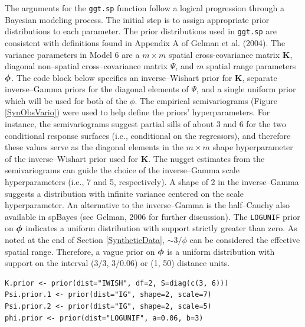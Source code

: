 \documentclass[a4paper]{article}
\newcommand{\bphi}{ \mbox{\boldmath $\phi$}}
\newcommand{\bK}{\textbf{K}}
\let\code=\texttt
\newcommand{\pkg}[1]{{\normalfont\fontseries{b}\selectfont #1}}
\begin{document}
The arguments for the \code{ggt.sp} function follow a logical
progression through a Bayesian modeling process.  The initial step
is to assign appropriate prior distributions to each parameter.  The
prior distributions used in \code{ggt.sp} are consistent with
definitions found in Appendix A of Gelman et al. (2004).   The variance
parameters in Model 6 are a $m\times m$ spatial cross-covariance
matrix $\bK$, diagonal non--spatial cross--covariance matrix $\Psi$,
and $m$ spatial range parameters $\bphi$.  The code block below
specifies an inverse--Wishart prior for $\bK$, separate
inverse--Gamma priors for the diagonal elements of $\Psi$, and a
single uniform prior which will be used for both of the $\phi$.  The
empirical semivariograms (Figure \ref{SynObsVario}) were used to
help define the priors' hyperparameters.  For instance, the
semivariograms suggest partial sills of about 3 and 6 for the two
conditional response surfaces (i.e., conditional on the regressors),
and therefore these values serve as the diagonal elements in the
$m\times m$ shape hyperparameter of the  inverse--Wishart prior used
for $\bK$.  The nugget estimates from the semivariograms can guide
the choice of the inverse--Gamma scale hyperparameters (i.e., 7 and
5, respectively).  A shape of 2 in the inverse--Gamma suggests a
distribution with infinite variance centered on the scale
hyperparameter.  An alternative to the inverse--Gamma is the
half--Cauchy also available in \pkg{spBayes} (see Gelman, 2006 for further discussion).  The
\code{LOGUNIF} prior on $\bphi$ indicates a uniform distribution
with support strictly greater than zero.  As noted at the end of
Section \ref{SyntheticData}, $\sim 3/\phi$ can be considered the
effective spatial range.  Therefore, a vague prior on $\bphi$ is a
uniform distribution with support on the interval ($3/3$, $3/0.06$) or (1, 50)
distance units.
 \begin{verbatim}
K.prior <- prior(dist="IWISH", df=2, S=diag(c(3, 6)))
Psi.prior.1 <- prior(dist="IG", shape=2, scale=7)
Psi.prior.2 <- prior(dist="IG", shape=2, scale=5)
phi.prior <- prior(dist="LOGUNIF", a=0.06, b=3)
 \end{verbatim}
\end{document}
